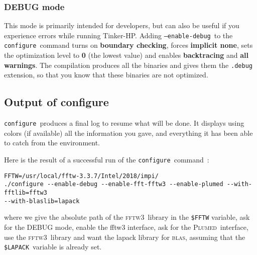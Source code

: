 \documentclass[peerreview]{IEEEtran}
\def\LAPACK{\texttt{\$LAPACK}}
\def\blas{\textsc{blas}}
\def\fftwt{\textsc{fftw3}}
\def\config{\texttt{configure}}
\def\plumed{\textsc{Plumed}}
\def\enadeb{\texttt{--enable-debug}}
\begin{document}
\vskip5mm
\subsubsection{DEBUG mode}
This mode is primarily intended for developers, but can also be useful if you experience errors while running Tinker-HP. Adding \enadeb\ to the \config\ command turns on \textbf{boundary checking}, forces  \textbf{implicit none}, sets the optimization level to \textbf{0} (the lowest value) and enables \textbf{backtracing} and  \textbf{all warnings}. The compilation produces all the binaries and gives them the \texttt{.debug} extension, so that you know that these binaries are not optimized. 

\subsection{Output of configure}
\config\ produces a final log to resume what will be done. It displays using colors (if available) all the information you gave, and everything it has been able to catch from the environment. 

Here is the result of a successful run of the \config\ command~:

\begin{verbatim}
FFTW=/usr/local/fftw-3.3.7/Intel/2018/impi/
./configure --enable-debug --enable-fft-fftw3 --enable-plumed --with-fftlib=fftw3
--with-blaslib=lapack
\end{verbatim}

where we give the absolute path of the \fftwt\  library in the \texttt{\$FFTW} variable, ask for the DEBUG mode, enable the fftw3 interface, ask for the \plumed\ interface, use the \fftwt\ library and want the lapack library for  \blas, assuming that the  \LAPACK\  variable is already set.
\end{document}
